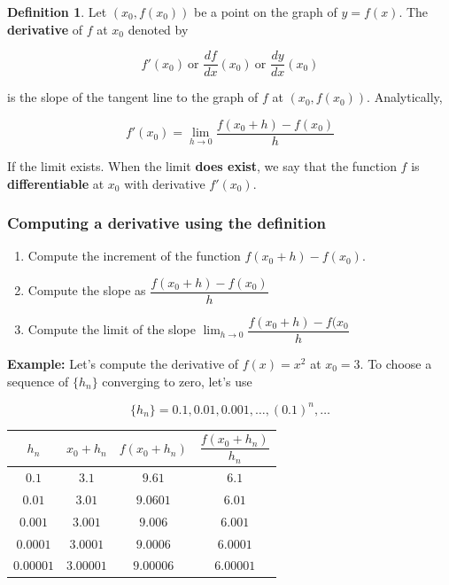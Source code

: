 \documentclass[a4paper,11pt]{article}
\theoremstyle{definition}
\newtheorem{definition}{Definition}
\theoremstyle{plain}
\begin{document}
\begin{definition}
Let \(\left(x_0, f(x_0)\right)\) be a point on the
graph of \(y = f(x)\). The \textbf{derivative} of \(f\) at \(x_0\)
denoted by

\[
f'(x_0) \ \text{or } \frac{df}{dx}(x_0) \ \text{or } \frac{dy}{dx}(x_0)
\]

is the slope of the tangent line to the graph of \(f\) at
\(\left(x_0, f(x_0)\right)\). Analytically,

\[
f'(x_0) = \lim_{h\rightarrow 0} \frac{f(x_0 + h) - f(x_0)}{h}
\]

If the limit exists. When the limit \textbf{does exist}, we say that the
function \(f\) is \textbf{differentiable} at \(x_0\) with derivative
\(f'(x_0)\).
\end{definition}

\subsubsection{Computing a derivative using the
definition}\label{computing-a-derivative-using-the-definition}

\begin{enumerate}
\def\labelenumi{\arabic{enumi}.}
\item
  Compute the increment of the function \(f(x_0 + h) - f(x_0)\).
\item
  Compute the slope as \(\dfrac{f(x_0+h)-f(x_0)}{h}\)
\item
  Compute the limit of the slope
  \(\lim_{h\rightarrow 0}{\dfrac{f(x_0+h)-f(x_0}{h}}\)
\end{enumerate}

\textbf{Example:} Let's compute the derivative of \(f(x) = x^2\) at
\(x_0 = 3\). To choose a sequence of \(\{h_n\}\) converging to zero,
let's use

\[
\{h_n\} = 0.1, 0.01, 0.001,\ldots,(0.1)^n,\ldots
\]

\begin{table}[htbp]
\centering
\begin{tabular}{cccc}
\toprule
   $h_n$ &   $x_0+h_n$ &   $f(x_0 + h_n)$ &   $\dfrac{f(x_0 + h_n)}{h_n}$ \\ \midrule
  $0.1$    &     $3.1$     &          $9.61$    &                      $6.1$     \\
  $0.01$   &     $3.01$    &          $9.0601$  &                      $6.01$    \\
  $0.001$  &     $3.001$   &          $9.006$   &                      $6.001$   \\
  $0.0001$ &     $3.0001$  &          $9.0006$  &                      $6.0001$  \\
  $0.00001$  &     $3.00001$ &          $9.00006$ &                      $6.00001$ \\
\bottomrule
\end{tabular}
\end{table}
\end{document}
